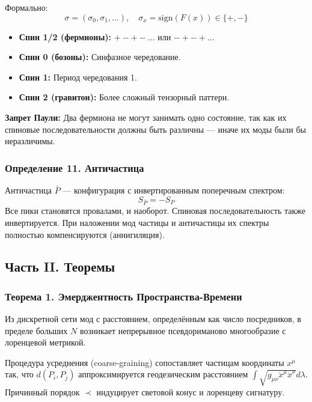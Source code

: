 \documentclass[12pt,a4paper]{article}
\begin{document}
Формально:
\begin{equation}
    \sigma = (\sigma_0, \sigma_1, \dots), \quad \sigma_x = \text{sign}(F(x)) \in \{+, -\}
\end{equation}

\begin{itemize}
    \item \textbf{Спин 1/2 (фермионы):} $+ - + - \dots$ или $- + - + \dots$
    \item \textbf{Спин 0 (бозоны):} Синфазное чередование.
    \item \textbf{Спин 1:} Период чередования 1.
    \item \textbf{Спин 2 (гравитон):} Более сложный тензорный паттерн.
\end{itemize}

\textbf{Запрет Паули:} Два фермиона не могут занимать одно состояние, так как их спиновые последовательности должны быть различны --- иначе их моды были бы неразличимы.

\subsubsection{Определение 11. Античастица}
Античастица $\bar{P}$ --- конфигурация с инвертированным поперечным спектром:
\begin{equation}
    S_{\bar{P}} = -S_P
\end{equation}
Все пики становятся провалами, и наоборот. Спиновая последовательность также инвертируется. При наложении мод частицы и античастицы их спектры полностью компенсируются (аннигиляция).

\subsection{Часть II. Теоремы}

\subsubsection{Теорема 1. Эмерджентность Пространства-Времени}
Из дискретной сети мод с расстоянием, определённым как число посредников, в пределе больших $N$ возникает непрерывное псевдориманово многообразие с лоренцевой метрикой.

Процедура усреднения (coarse-graining) сопоставляет частицам координаты $x^\mu$ так, что $d(P_i, P_j)$ аппроксимируется геодезическим расстоянием $\int \sqrt{g_{\mu\nu} \dot{x}^\mu \dot{x}^\nu} d\lambda$. Причинный порядок $\prec$ индуцирует световой конус и лоренцеву сигнатуру.
\end{document}
